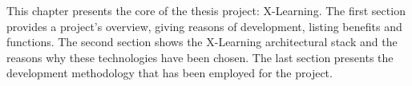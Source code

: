 This chapter presents the core of the thesis project: X-Learning.
The first section provides a project’s overview, giving reasons of development, listing benefits and functions. The second section shows the X-Learning architectural stack and the reasons why these technologies have been chosen. The last section presents the development methodology that has been employed for the project.
